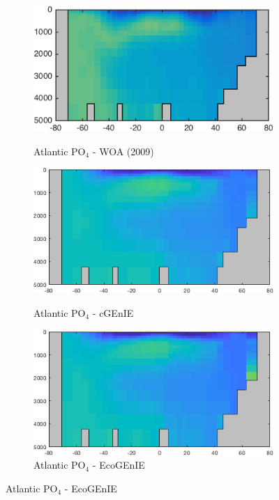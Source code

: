 \documentclass{article}
\begin{document}
\begin{figure}[htp]
 \centering
\begin{subfigure}{.33\textwidth}
 \caption{Atlantic PO$_4$ - WOA (2009)}
 \includegraphics[width=0.95\linewidth]{../Separate_figures/OBSERVATIONS/Atlantic_p_an_profile.png}
 \label{fig:nutrients1}
\end{subfigure}%
\begin{subfigure}{.33\textwidth}
 \caption{Atlantic PO$_4$ - cGEnIE}
 \includegraphics[width=0.95\linewidth]{../Separate_figures/BIOGEM/Atlantic_ocn_PO4_profile.png}
 \label{fig:nutrients1}
\end{subfigure}%
\begin{subfigure}{.33\textwidth}
 \caption{Atlantic PO$_4$ - EcoGEnIE}
 \includegraphics[width=0.95\linewidth]{../Separate_figures/ECOGEM/Atlantic_ocn_PO4_profile.png}

\end{subfigure}
\end{figure}
\end{document}
